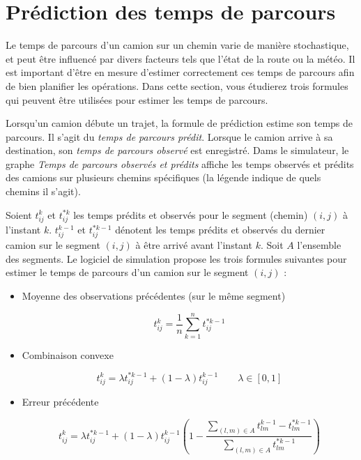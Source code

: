 	\section{Prédiction des temps de parcours}

	Le temps de parcours d’un camion sur un chemin varie de manière stochastique, et peut être influencé par divers facteurs tels que l’état de la route ou la météo. Il est important d'être en mesure d'estimer correctement ces temps de parcours afin de bien planifier les opérations. Dans cette section, vous étudierez trois formules qui peuvent être utilisées pour estimer les temps de parcours. 
	
	Lorsqu'un camion débute un trajet, la formule de prédiction estime son temps de parcours. Il s'agit du \textit{temps de parcours prédit}. Lorsque le camion arrive à sa destination, son \textit{temps de parcours observé} est enregistré. Dams le simulateur, le graphe \textit{Temps de parcours observés et prédits} affiche les temps observés et prédits des camions sur plusieurs chemins spécifiques (la légende indique de quels chemins il s'agit).
	
	
	Soient $t_{ij}^k$ et $t^{*k}_{ij}$ les temps prédits et observés pour le segment (chemin) $(i,j)$ à l'instant $k$. $t_{ij}^{k-1}$ et $t^{*k-1}_{ij}$ dénotent les temps prédits et observés du dernier camion sur le segment $(i, j)$ à être arrivé avant l'instant $k$. Soit $A$ l'ensemble des segments. Le logiciel de simulation propose les trois formules suivantes pour estimer le temps de parcours d’un camion sur le segment $(i,j)$ : 
	
	
	\begin{itemize}
		
		\item Moyenne des observations précédentes (sur le même segment)
		
		\begin{equation}
		t_{ij}^k = \frac{1}{n} \sum\limits_{k=1}^n t_{ij}^{*k-1}
		\end{equation}
		
		\item Combinaison convexe
		
		\begin{equation}
		t_{ij}^k = \lambda t^{*k-1}_{ij} + (1-\lambda) t_{ij}^{k-1} \qquad \lambda \in [0, 1]
		\end{equation}
		
		\item Erreur précédente
		
		\begin{equation}
		t_{ij}^k = \lambda t^{*k-1}_{ij} + (1-\lambda) t_{ij}^{k-1} \left( 1- \frac{\sum\limits_{(l,m) \in A} t_{lm}^{k-1} - t_{lm}^{*k-1}}{\sum\limits_{(l,m) \in A} t_{lm}^{*k-1}}\right)
		\end{equation}
		
		
	\end{itemize}
	
